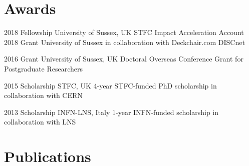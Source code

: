 \documentclass[print]{cv} %
\begin{document}
\section{Awards}

\begin{entrylist}
  \entry 
      {2018}
      {Fellowship}
      {University of Sussex, UK}
      {STFC Impact Acceleration Account}
  \entry 
      {2018}
      {Grant}
      {University of Sussex in collaboration with Deckchair.com}
      {DISCnet}

  \entry
      {2016}
      {Grant}
      {University of Sussex, UK}
      {Doctoral Overseas Conference Grant for Postgraduate Researchers}

  \entry
      {2015}
      {Scholarship}
      {STFC, UK}
      {4-year STFC-funded PhD scholarship in collaboration with CERN}

  \entry
      {2013}
      {Scholarship}
      {INFN-LNS, Italy}
      {1-year INFN-funded scholarship in collaboration with LNS}
\end{entrylist}

 \clearpage\section{Publications}
 \begin{refsection} %
 \nocite{*}
     \printbibliography[type=inproceedings, title={International peer-reviewed conferences/proceedings}, heading=bibheading]
\end{refsection}
\raggedbottom
\end{document}
